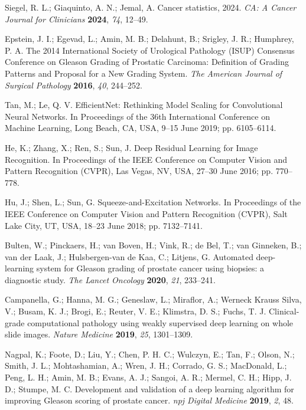 Siegel, R. L.; Giaquinto, A. N.; Jemal, A. Cancer statistics, 2024. \textit{CA: A Cancer Journal for Clinicians} \textbf{2024}, \textit{74}, 12--49.

Epstein, J. I.; Egevad, L.; Amin, M. B.; Delahunt, B.; Srigley, J. R.; Humphrey, P. A. The 2014 International Society of Urological Pathology (ISUP) Consensus Conference on Gleason Grading of Prostatic Carcinoma: Definition of Grading Patterns and Proposal for a New Grading System. \textit{The American Journal of Surgical Pathology} \textbf{2016}, \textit{40}, 244--252.

Tan, M.; Le, Q. V. EfficientNet: Rethinking Model Scaling for Convolutional Neural Networks. In Proceedings of the 36th International Conference on Machine Learning, Long Beach, CA, USA, 9--15 June 2019; pp. 6105--6114.

He, K.; Zhang, X.; Ren, S.; Sun, J. Deep Residual Learning for Image Recognition. In Proceedings of the IEEE Conference on Computer Vision and Pattern Recognition (CVPR), Las Vegas, NV, USA, 27--30 June 2016; pp. 770--778.

Hu, J.; Shen, L.; Sun, G. Squeeze-and-Excitation Networks. In Proceedings of the IEEE Conference on Computer Vision and Pattern Recognition (CVPR), Salt Lake City, UT, USA, 18--23 June 2018; pp. 7132--7141.

Bulten, W.; Pinckaers, H.; van Boven, H.; Vink, R.; de Bel, T.; van Ginneken, B.; van der Laak, J.; Hulsbergen-van de Kaa, C.; Litjens, G. Automated deep-learning system for Gleason grading of prostate cancer using biopsies: a diagnostic study. \textit{The Lancet Oncology} \textbf{2020}, \textit{21}, 233--241.

Campanella, G.; Hanna, M. G.; Geneslaw, L.; Miraflor, A.; Werneck Krauss Silva, V.; Busam, K. J.; Brogi, E.; Reuter, V. E.; Klimstra, D. S.; Fuchs, T. J. Clinical-grade computational pathology using weakly supervised deep learning on whole slide images. \textit{Nature Medicine} \textbf{2019}, \textit{25}, 1301--1309.

Nagpal, K.; Foote, D.; Liu, Y.; Chen, P. H. C.; Wulczyn, E.; Tan, F.; Olson, N.; Smith, J. L.; Mohtashamian, A.; Wren, J. H.; Corrado, G. S.; MacDonald, L.; Peng, L. H.; Amin, M. B.; Evans, A. J.; Sangoi, A. R.; Mermel, C. H.; Hipp, J. D.; Stumpe, M. C. Development and validation of a deep learning algorithm for improving Gleason scoring of prostate cancer. \textit{npj Digital Medicine} \textbf{2019}, \textit{2}, 48.

